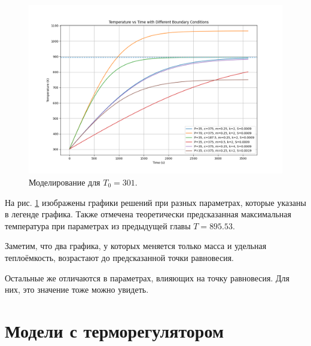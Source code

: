 \begin{figure}[h]  %
	\centering
	\includegraphics[width=1\textwidth]{imgs/heater_w.o_controll.png}  %
	\caption{Моделирование для $T_0 = 301$.}  %
	\label{fig:heater_without_controll}  %
\end{figure}

На рис. \ref{fig:heater_without_controll} изображены графики решений при разных параметрах, которые указаны в легенде графика. Также отмечена теоретически предсказанная максимальная температура при параметрах из предыдущей главы $T = 895.53$.

Заметим, что два графика, у которых меняется только масса и удельная теплоёмкость, возрастают до предсказанной точки равновесия.

Остальные же отличаются в параметрах, влияющих на точку равновесия. Для них, это значение тоже можно увидеть.

\section{Модели с терморегулятором}


